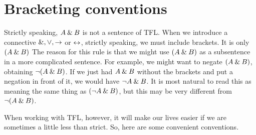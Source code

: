 %
%
%
%
%

%
%
%
%





\section{Bracketing conventions}
\label{TFLconventions}


Strictly speaking, $A\mathbin{\&} B$ is not a sentence of TFL. When we introduce a connective $\mathbin{\&},\vee,\rightarrow$ or $\leftrightarrow$, strictly speaking, we must include brackets. It is only $(A\mathbin{\&} B)$
The reason for this rule is that we might use $(A\mathbin{\&} B)$ as a subsentence in a more complicated sentence. For example, we might want to negate $(A\mathbin{\&} B)$, obtaining $\neg(A\mathbin{\&} B)$. If we just had $A \mathbin{\&} B$ without the brackets and put a negation in front of it, we would have $\neg A \mathbin{\&} B$. It is most natural to read this as meaning the same thing as $(\neg A \mathbin{\&} B)$, but this may be very different from $\neg(A\mathbin{\&} B)$.

When working with TFL, however, it will make our lives easier if we are sometimes a little less than strict. So, here are some convenient conventions.

